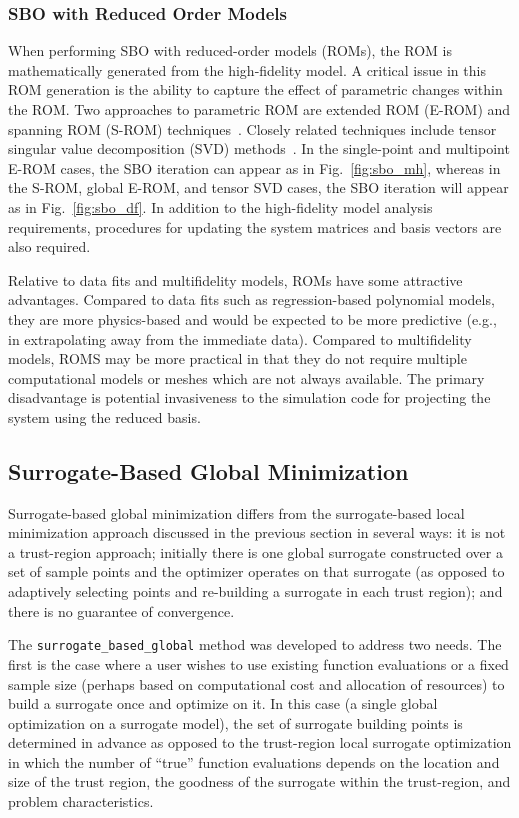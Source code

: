\subsubsection{SBO with Reduced Order Models}\label{adv_meth:sbm:sblm:rom}

When performing SBO with reduced-order models (ROMs), the ROM is
mathematically generated from the high-fidelity model.  A critical
issue in this ROM generation is the ability to capture the effect of
parametric changes within the ROM.  Two approaches to parametric ROM
are extended ROM (E-ROM) and spanning ROM (S-ROM)
techniques~\cite{Wei06}.  Closely related techniques include tensor
singular value decomposition (SVD) methods~\cite{Lat00}.  In the
single-point and multipoint E-ROM cases, the SBO iteration can appear
as in Fig.~\ref{fig:sbo_mh}, whereas in the S-ROM, global E-ROM, and
tensor SVD cases, the SBO iteration will appear as in
Fig.~\ref{fig:sbo_df}.  In addition to the high-fidelity model
analysis requirements, procedures for updating the system matrices and
basis vectors are also required.

Relative to data fits and multifidelity models, ROMs have some
attractive advantages.  Compared to data fits such as regression-based
polynomial models, they are more physics-based and would be expected
to be more predictive (e.g., in extrapolating away from the immediate
data).  Compared to multifidelity models, ROMS may be more practical
in that they do not require multiple computational models or meshes
which are not always available.  The primary disadvantage is potential
invasiveness to the simulation code for projecting the system using
the reduced basis.


\subsection{Surrogate-Based Global Minimization}\label{adv_meth:sbm:sbgm}

Surrogate-based global minimization differs from the surrogate-based
local minimization approach discussed in the previous section in
several ways: it is not a trust-region approach; initially there is
one global surrogate constructed over a set of sample points and the
optimizer operates on that surrogate (as opposed to adaptively
selecting points and re-building a surrogate in each trust region);
and there is no guarantee of convergence.

The \texttt{surrogate\_based\_global} method was developed to address
two needs.  The first is the case where a user wishes to use existing
function evaluations or a fixed sample size (perhaps based on
computational cost and allocation of resources) to build a surrogate
once and optimize on it.  In this case (a single global optimization
on a surrogate model), the set of surrogate building points is
determined in advance as opposed to the trust-region local surrogate
optimization in which the number of ``true'' function evaluations
depends on the location and size of the trust region, the goodness of
the surrogate within the trust-region, and problem characteristics.

